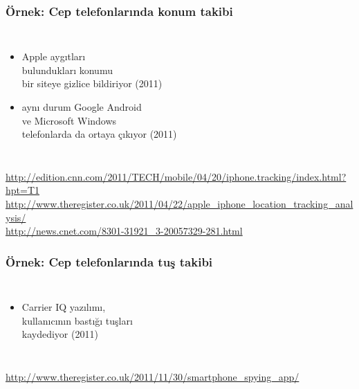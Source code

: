 \documentclass[dvipsnames]{beamer}
\theoremstyle{definition}
\theoremstyle{example}
\theoremstyle{plain}
\begin{document}
\begin{frame}
  \frametitle{Örnek: Cep telefonlarında konum takibi}

  \begin{columns}

    \begin{itemize}
      \item Apple aygıtları\\
        bulundukları konumu\\
        bir siteye gizlice bildiriyor (2011)
      \item aynı durum Google Android\\
        ve Microsoft Windows\\
        telefonlarda da ortaya çıkıyor (2011)
    \end{itemize}
  \end{columns}

  \medskip
  \tiny{\url{http://edition.cnn.com/2011/TECH/mobile/04/20/iphone.tracking/index.html?hpt=T1}}\\
  \tiny{\url{http://www.theregister.co.uk/2011/04/22/apple_iphone_location_tracking_analysis/}}\\
  \tiny{\url{http://news.cnet.com/8301-31921_3-20057329-281.html}}\\
\end{frame}

\begin{frame}
  \frametitle{Örnek: Cep telefonlarında tuş takibi}

  \begin{columns}

    \begin{itemize}
      \item Carrier IQ yazılımı,\\
        kullanıcının bastığı tuşları\\
        kaydediyor (2011)
    \end{itemize}
  \end{columns}

  \medskip
  \tiny{\url{http://www.theregister.co.uk/2011/11/30/smartphone_spying_app/}}\\
\end{frame}
\end{document}

